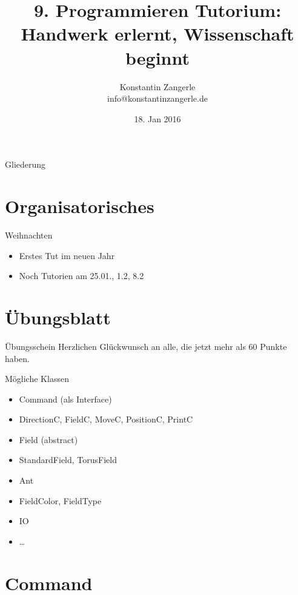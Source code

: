 \documentclass[18pt]{beamer}
\title[Programmieren Tutorium]{9. Programmieren Tutorium:\texorpdfstring{\\}{} Handwerk erlernt, Wissenschaft beginnt}
\author{Konstantin Zangerle \texorpdfstring{\\}{} info@konstantinzangerle.de}
\date{18. Jan 2016}
\begin{document}

\begin{frame}
\titlepage
\end{frame}

\begin{frame}{Gliederung}
\tableofcontents
\end{frame}

\section{Organisatorisches}

\begin{frame}{Weihnachten}
 \begin{itemize}
  \item Erstes Tut im neuen Jahr
  \item Noch Tutorien am 25.01., 1.2, 8.2
 \end{itemize}

\end{frame}





\section{Übungsblatt}
\begin{frame}{Übungsschein}
  \large
  Herzlichen Glückwunsch an alle, die jetzt mehr als 60 Punkte haben.
\end{frame}

\begin{frame}{Mögliche Klassen}
 \begin{itemize}
  \item Command (als Interface)
  \item DirectionC, FieldC, MoveC, PositionC, PrintC
  \item Field (abstract)
  \item StandardField, TorusField
  \item Ant
  \item FieldColor, FieldType
  \item IO
  \item \dots
 \end{itemize}

\end{frame}


\section{Command}
\end{document}
